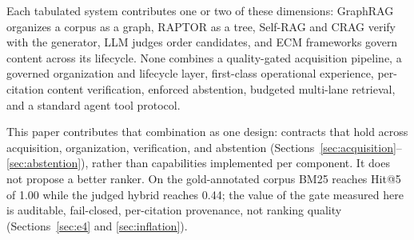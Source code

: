 Each tabulated system contributes one or two of these dimensions: GraphRAG
organizes a corpus as a graph, RAPTOR as a tree, Self-RAG and CRAG verify with
the generator, LLM judges order candidates, and ECM frameworks govern content
across its lifecycle. None combines a quality-gated acquisition pipeline, a
governed organization and lifecycle layer, first-class operational experience,
per-citation content verification, enforced abstention, budgeted multi-lane
retrieval, and a standard agent tool protocol.

This paper contributes that combination as one design: contracts that hold
across acquisition, organization, verification, and abstention
(Sections~\ref{sec:acquisition}--\ref{sec:abstention}), rather than capabilities
implemented per component. It does not propose a better ranker. On the
gold-annotated corpus BM25 reaches Hit@5 of 1.00 while the judged hybrid reaches
0.44; the value of the gate measured here is auditable, fail-closed,
per-citation provenance, not ranking quality (Sections~\ref{sec:e4} and
\ref{sec:inflation}).
